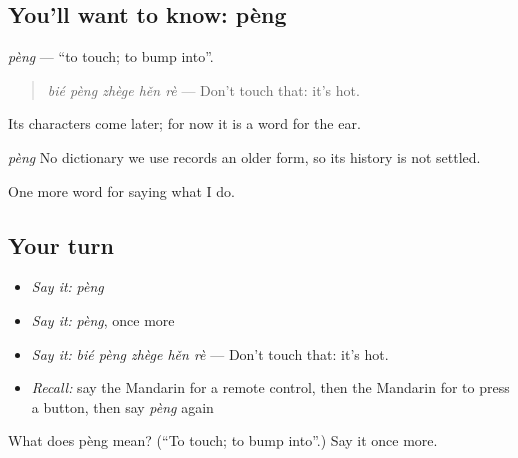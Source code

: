 \subsection*{You'll want to know: pèng}
\emph{pèng} — \textquotedblleft{}to touch; to bump into\textquotedblright{}.

\begin{quote}
\emph{bié pèng zhège hěn rè} — Don't touch that: it's hot.
\end{quote}

Its characters come later; for now it is a word for the ear.

\begin{cousinweb}
\emph{pèng} No dictionary we use records an older form, so its history is not settled.
\end{cousinweb}

\begin{grammarlens}[title={What you've built}]
One more word for saying what I do.
\end{grammarlens}

\subsection*{Your turn}
\begin{itemize}
\raggedright
  \item \emph{Say it:} \emph{pèng}
  \item \emph{Say it:} \emph{pèng}, once more
  \item \emph{Say it:} \emph{bié pèng zhège hěn rè} — Don't touch that: it's hot.
  \item \emph{Recall:} say the Mandarin for a remote control, then the Mandarin for to press a button, then say \emph{pèng} again
\end{itemize}

\begin{tcolorbox}[breakable,colback=teal!4,colframe=teal!35!black,title={Before you move on}]
What does pèng mean? (\textquotedblleft{}To touch; to bump into\textquotedblright{}.) Say it once more.
\end{tcolorbox}

